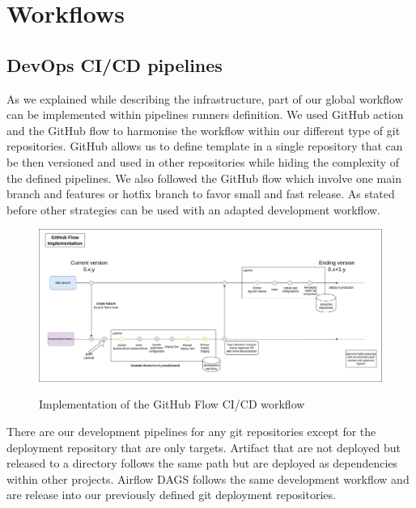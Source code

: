 \section{Workflows}\label{sec:workflow}

\subsection{DevOps CI/CD pipelines}\label{subsec:ci/cd-pipelines-and-development-workflow}
As we explained while describing the infrastructure, part of our global workflow can be implemented within pipelines runners definition.
We used GitHub action and the GitHub flow to harmonise the workflow within our different type of git repositories.
GitHub allows us to define template in a single repository that can be then versioned and used in other repositories while hiding the complexity of the defined pipelines.
We also followed the GitHub flow which involve one main branch and features or hotfix branch to favor small and fast release.
As stated before other strategies can be used with an adapted development workflow.

\begin{figure}[!htbp]
    \centering
    \caption{Implementation of the GitHub Flow CI/CD workflow}
    \includegraphics[scale=0.3]{images/project/cicd-workflow-p1}
    \label{fig:icd-workflow-p1}
\end{figure}

There are our development pipelines for any git repositories except for the deployment repository that are only targets.
Artifact that are not deployed but released to a directory follows the same path but are deployed as dependencies within other projects.
Airflow DAGS follows the same development workflow and are release into our previously defined git deployment repositories.

